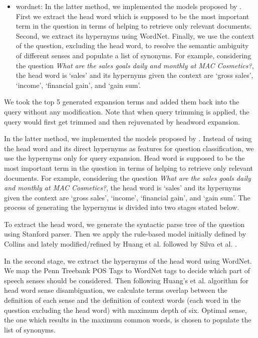 \documentclass[a4paper,10pt,conference,compsocconf,final]{IEEEtran}
\newcommand\method[1]{{\sf\small{#1}}}
\begin{document}
{{{{\begin{itemize}
  \item \method{wordnet}: In the latter method, we implemented the models
    proposed by \cite{huang2008question, silva2011symbolic}. First we extract
    the head word which is supposed to be the most important term in the
    question in terms of helping to retrieve only relevant documents. Second,
    we extract its hypernyms using WordNet. Finally, we use the context of the
    question, excluding the head word, to resolve the semantic ambiguity of
    different senses and populate a list of synonyms. For example, considering
    the question \textit{What are the sales goals daily and monthly at MAC
    Cosmetics?}, the head word is `sales' and its hypernyms given the context
    are `gross sales', `income', `financial gain', and `gain sum'.
\end{itemize}

We took the top 5 generated expansion terms and added them back into the query
without any modification.  Note that when query trimming is applied, the query
would first get trimmed and then rejuvenated by headword expansion.

In the latter method, we implemented the models proposed by \cite{huang2008question, silva2011symbolic}. Instead of using the head word and its direct hypernyms as features for question classification, we use the hypernyms only for query expansion. Head word is supposed to be the most important term in the question in terms of helping to retrieve only relevant documents. For example, considering the question \textit{What are the sales goals daily and monthly at MAC Cosmetics?}, the head word is `sales' and its hypernyms given the context are `gross sales', `income', `financial gain', and `gain sum'. The process of generating the hypernyms is divided into two stages stated below.

To extract the head word, we generate the syntactic parse tree of the question using Stanford parser. Then we apply the rule-based model initially defined by Collins \cite{collins2003head} and lately modified/refined by Huang et al. \cite{huang2008question} followed by Silva et al. \cite{silva2011symbolic}.

In the second stage, we extract the hypernyms of the head word using WordNet. We map the Penn Treebank POS Tags to WordNet tags to decide which part of speech senses should be considered. Then following Huang's et al. \cite{huang2008question} algorithm for head word sense disambiguation, we calculate terms overlap between the definition of each sense and the definition of context words (each word in the question excluding the head word) with maximum depth of six. Optimal sense, the one which results in the maximum common words, is chosen to  populate the list of synonyms.

}}}}
\end{document}
